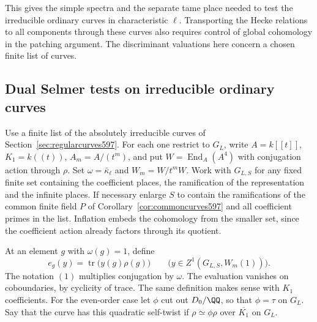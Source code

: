 \documentclass[a4paper,11pt]{article}
\theoremstyle{definition}
\theoremstyle{remark}
\numberwithin{equation}{section}
\begin{document}
This gives the simple spectra and the separate tame place
needed to test the irreducible ordinary curves in characteristic
\(\ell\). Transporting the Hecke relations to all components
through these curves also requires control of global
cohomology in the patching argument. The discriminant
valuations here concern a chosen finite list of curves.


\subsection{Dual Selmer tests on irreducible ordinary curves}
\label{sec:dualtests598}

Use a finite list of the absolutely irreducible curves of
Section~\ref{sec:regularcurves597}. For each one restrict
to \(G_L\), write \(A=k[[t]]\), \(K_1=k((t))\),
\(A_m=A/(t^m)\), and put \(W=\operatorname{End}_A(A^4)\)
with conjugation action through \(\rho\). Set
\(\omega=\bar\kappa_\ell\) and \(W_m=W/t^mW\). Work with
\(G_{L,S}\) for any fixed finite set containing the
coefficient places, the ramification of the representation
and the infinite places. If necessary enlarge \(S\) to contain
the ramifications of the common finite field \(P\) of
Corollary~\ref{cor:commoncurves597} and all coefficient primes
in the list. Inflation embeds the cohomology from the
smaller set, since the coefficient action already factors
through its quotient.

At an element \(g\) with \(\omega(g)=1\), define
\[
             e_g(y)=\operatorname{tr}\bigl(y(g)\rho(g)\bigr)
               \qquad \bigl(y\in Z^1(G_{L,S},W_m(1))\bigr).
\]
The notation \((1)\) multiplies conjugation by \(\omega\).
The evaluation vanishes on coboundaries, by cyclicity of
trace. The same definition makes sense with \(K_1\)
coefficients. For the even-order case let \(\phi\) cut out
\(D_0/\QQ\), so that \(\phi=\tau\) on \(G_L\). Say that
the curve has this quadratic self-twist if
\(\rho\simeq\phi\rho\) over \(\overline{K_1}\) on \(G_L\).
\end{document}
